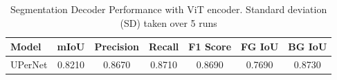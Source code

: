 \begin{table}
	\centering
	\scriptsize %
	\setlength{\tabcolsep}{3pt} %
	\vspace{-1.5em}
	\caption{Segmentation Decoder Performance with ViT encoder. Standard deviation (SD) taken over 5 runs}
	\label{tab:decoders}
	\begin{tabular}{lcccccc}
		\toprule
		\textbf{Model} & \textbf{mIoU} & \textbf{Precision} & \textbf{Recall} & \textbf{F1 Score} & \textbf{FG IoU} & \textbf{BG IoU} \\
		\midrule
		UPerNet        & 0.8210        & 0.8670             & 0.8710          & 0.8690            & 0.7690          & 0.8730          \\
		\bottomrule
	\end{tabular}
	\vspace{-1.5em}
\end{table}
